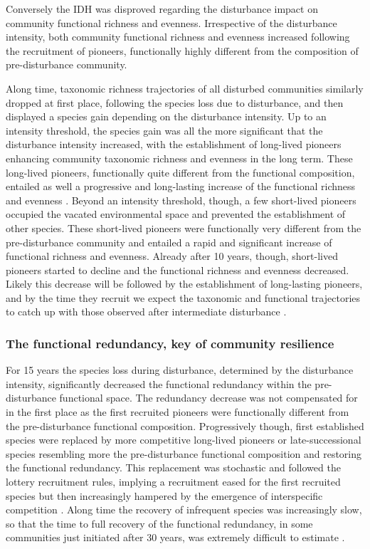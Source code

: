 \documentclass[
  11pt,
  french,
  A4paper,
  extrafontsizes,onecolumn,openright
  ]{memoir}
\begin{document}
Conversely the IDH was disproved regarding the disturbance impact on
community functional richness and evenness. Irrespective of the
disturbance intensity, both community functional richness and evenness
increased following the recruitment of pioneers, functionally highly
different from the composition of pre-disturbance community.

Along time, taxonomic richness trajectories of all disturbed communities
similarly dropped at first place, following the species loss due to
disturbance, and then displayed a species gain depending on the
disturbance intensity. Up to an intensity threshold, the species gain
was all the more significant that the disturbance intensity increased,
with the establishment of long-lived pioneers enhancing community
taxonomic richness and evenness in the long term. These long-lived
pioneers, functionally quite different from the functional composition,
entailed as well a progressive and long-lasting increase of the
functional richness and evenness \autocites{Denslow1980}{Molino2001}.
Beyond an intensity threshold, though, a few short-lived pioneers
occupied the vacated environmental space and prevented the establishment
of other species. These short-lived pioneers were functionally very
different from the pre-disturbance community and entailed a rapid and
significant increase of functional richness and evenness. Already after
10 years, though, short-lived pioneers started to decline and the
functional richness and evenness decreased. Likely this decrease will be
followed by the establishment of long-lasting pioneers, and by the time
they recruit we expect the taxonomic and functional trajectories to
catch up with those observed after intermediate disturbance
\autocite{Walker2009}.

\subsubsection{The functional redundancy, key of community
resilience}\label{the-functional-redundancy-key-of-community-resilience}

For 15 years the species loss during disturbance, determined by the
disturbance intensity, significantly decreased the functional redundancy
within the pre-disturbance functional space. The redundancy decrease was
not compensated for in the first place as the first recruited pioneers
were functionally different from the pre-disturbance functional
composition. Progressively though, first established species were
replaced by more competitive long-lived pioneers or late-successional
species resembling more the pre-disturbance functional composition and
restoring the functional redundancy. This replacement was stochastic and
followed the lottery recruitment rules, implying a recruitment eased for
the first recruited species but then increasingly hampered by the
emergence of interspecific competition \autocite{Busing2002}. Along time
the recovery of infrequent species was increasingly slow, so that the
time to full recovery of the functional redundancy, in some communities
just initiated after 30 years, was extremely difficult to estimate
\autocites{Elmqvist2003}{Diaz2005}.
\end{document}
